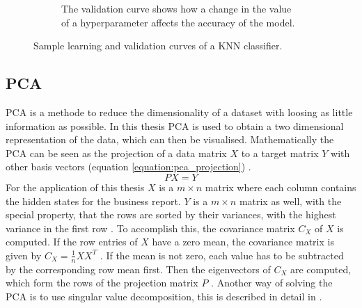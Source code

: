 \begin{figure}[h]
\begin{subfigure}{0.5\textwidth}
        \caption{The validation curve shows how a change in the value of a hyperparameter affects the accuracy of the model.}
        \label{figure:bert_pretraining_learning_512_nsp}
    \end{subfigure}
    \caption{Sample learning and validation curves of a \ac{KNN} classifier.}
    \label{figure:bert_pretraining_learning_512}
\end{figure}


\subsection{\acl{PCA}}
\acl{PCA} is a methode to reduce the dimensionality of a dataset with loosing as little information as possible.
In this thesis \ac{PCA} is used to obtain a two dimensional representation of the data, which can then be visualised.
Mathematically the \ac{PCA} can be seen as the projection of a data matrix $X$ to a target matrix $Y$ with other basis vectors (equation \ref{equation:pca_projection}) \cite[p. 3]{Shlens2014}.
\begin{equation}
    PX=Y
    \label{equation:pca_projection}
\end{equation}
For the application of this thesis $X$ is a $m\times n$ matrix where each column contains the hidden states for the business report.
$Y$ is a $m\times n$ matrix as well, with the special property, that the rows are sorted by their variances, with the highest variance in the first row \cite[p. 5]{Shlens2014}.
To accomplish this, the covariance matrix $C_X$ of $X$ is computed.
If the row entries of $X$ have a zero mean, the covariance matrix is given by $C_X=\frac{1}{n}XX^T$ \cite[p. 5]{Shlens2014}.
If the mean is not zero, each value has to be subtracted by the corresponding row mean first.
Then the eigenvectors of $C_X$ are computed, which form the rows of the projection matrix $P$ \cite[p. 6]{Shlens2014}.
Another way of solving the \ac{PCA} is to use singular value decomposition, this is described in detail in \cite[p. 7]{Shlens2014}.


